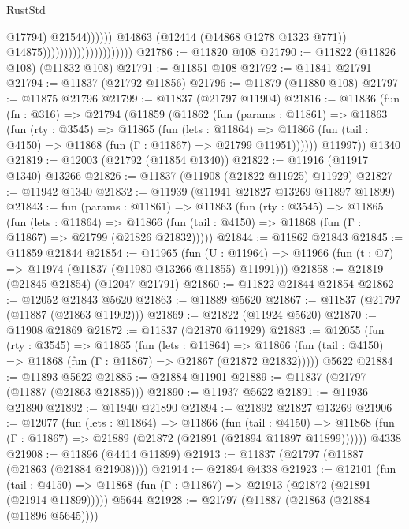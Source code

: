 \begin{lexlean}{RustStd}
\begin{coremodule}
{\begin{coremodule}
{{{{{{{{{{{{{{{{{{{{{{{{{{{{{{{{{{{{{{{{{{{{{{{{{{                                                            @17794)
                                                          @21544))))))
                                              @14863
                                              (@12414 (@14868 @1278 @1323 @771))
                                              @14875)))))))))))))))))))))
@21786 := @11820 @108
@21790 := @11822 (@11826 @108) (@11832 @108)
@21791 := @11851 @108
@21792 := @11841 @21791
@21794 := @11837 (@21792 @11856)
@21796 := @11879 (@11880 @108)
@21797 := @11875 @21796
@21799 := @11837 (@21797 @11904)
@21816 := @11836
    (fun (fn : @316) =>
    @21794
      (@11859
        (@11862
          (fun (params : @11861) =>
          @11863
            (fun (rty : @3545) =>
            @11865
              (fun (lets : @11864) =>
              @11866 (fun (tail : @4150) => @11868 (fun (Γ : @11867) => @21799 @11951))))))
        @11997))
    @1340
@21819 := @12003 (@21792 (@11854 @1340))
@21822 := @11916 (@11917 @1340) @13266
@21826 := @11837 (@11908 (@21822 @11925) @11929)
@21827 := @11942 @1340
@21832 := @11939 (@11941 @21827 @13269 @11897 @11899)
@21843 := fun (params : @11861) =>
  @11863
    (fun (rty : @3545) =>
    @11865
      (fun (lets : @11864) =>
      @11866 (fun (tail : @4150) => @11868 (fun (Γ : @11867) => @21799 (@21826 @21832)))))
@21844 := @11862 @21843
@21845 := @11859 @21844
@21854 := @11965
    (fun (U : @11964) => @11966 (fun (t : @7) => @11974 (@11837 (@11980 @13266 @11855) @11991)))
@21858 := @21819 (@21845 @21854) (@12047 @21791)
@21860 := @11822 @21844 @21854
@21862 := @12052 @21843 @5620
@21863 := @11889 @5620
@21867 := @11837 (@21797 (@11887 (@21863 @11902)))
@21869 := @21822 (@11924 @5620)
@21870 := @11908 @21869
@21872 := @11837 (@21870 @11929)
@21883 := @12055
    (fun (rty : @3545) =>
    @11865
      (fun (lets : @11864) =>
      @11866 (fun (tail : @4150) => @11868 (fun (Γ : @11867) => @21867 (@21872 @21832)))))
    @5622
@21884 := @11893 @5622
@21885 := @21884 @11901
@21889 := @11837 (@21797 (@11887 (@21863 @21885)))
@21890 := @11937 @5622
@21891 := @11936 @21890
@21892 := @11940 @21890
@21894 := @21892 @21827 @13269
@21906 := @12077
    (fun (lets : @11864) =>
    @11866
      (fun (tail : @4150) =>
      @11868 (fun (Γ : @11867) => @21889 (@21872 (@21891 (@21894 @11897 @11899))))))
    @4338
@21908 := @11896 (@4414 @11899)
@21913 := @11837 (@21797 (@11887 (@21863 (@21884 @21908))))
@21914 := @21894 @4338
@21923 := @12101
    (fun (tail : @4150) => @11868 (fun (Γ : @11867) => @21913 (@21872 (@21891 (@21914 @11899)))))
    @5644
@21928 := @21797 (@11887 (@21863 (@21884 (@11896 @5645))))
}}}}}}}}}}}}}}}}}}}}}}}}}}}}}}}}}}}}}}}}}}}}}}}}}}
\end{coremodule}}
\end{coremodule}
\end{lexlean}
